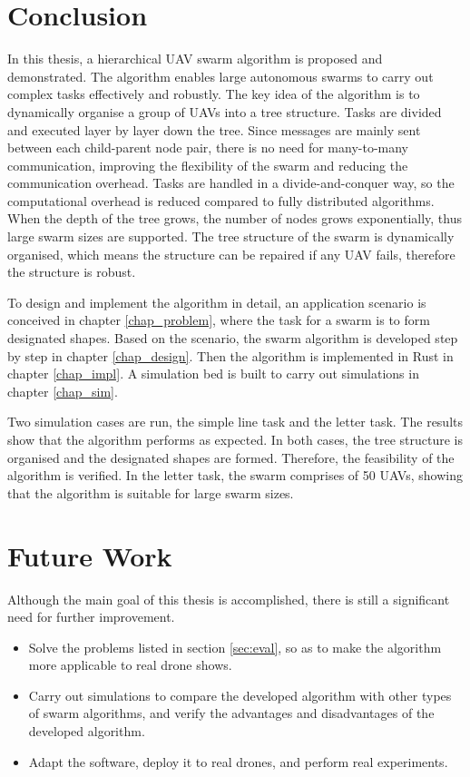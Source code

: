 \section{Conclusion}

In this thesis, a hierarchical UAV swarm algorithm is proposed and demonstrated.
The algorithm enables large autonomous swarms
to carry out complex tasks effectively and robustly.
The key idea of the algorithm is to dynamically organise a group of UAVs into a tree structure.
Tasks are divided and executed layer by layer down the tree.
Since messages are mainly sent between each child-parent node pair,
there is no need for many-to-many communication,
improving the flexibility of the swarm and reducing the communication overhead.
Tasks are handled in a divide-and-conquer way,
so the computational overhead is reduced compared to fully distributed algorithms.
When the depth of the tree grows, the number of nodes grows exponentially,
thus large swarm sizes are supported.
The tree structure of the swarm is dynamically organised,
which means the structure can be repaired if any UAV fails,
therefore the structure is robust.

To design and implement the algorithm in detail,
an application scenario is conceived in chapter \ref{chap_problem},
where the task for a swarm is to form designated shapes.
Based on the scenario, the swarm algorithm is developed step by step in chapter \ref{chap_design}.
Then the algorithm is implemented in Rust in chapter \ref{chap_impl}.
A simulation bed is built to carry out simulations in chapter \ref{chap_sim}.

Two simulation cases are run, the simple line task and the letter task.
The results show that the algorithm performs as expected.
In both cases, the tree structure is organised and the designated shapes are formed.
Therefore, the feasibility of the algorithm is verified.
In the letter task, the swarm comprises of 50 UAVs,
showing that the algorithm is suitable for large swarm sizes.

\section{Future Work}

Although the main goal of this thesis is accomplished,
there is still a significant need for further improvement.
\begin{itemize}
    \item Solve the problems listed in section \ref{sec:eval},
          so as to make the algorithm more applicable to real drone shows.
    \item Carry out simulations to
          compare the developed algorithm with other types of swarm algorithms,
          and verify the advantages and disadvantages of the developed algorithm.
    \item Adapt the software, deploy it to real drones, and perform real experiments.
\end{itemize}

